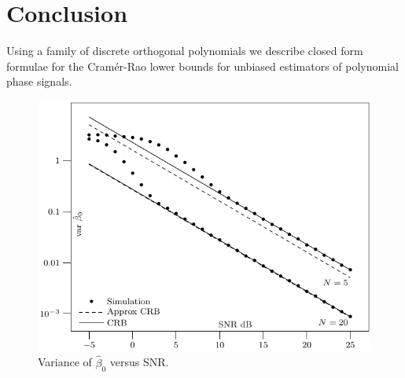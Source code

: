 \documentclass[review]{elsarticle}
\begin{document}
 
\section{Conclusion}

Using a family of discrete orthogonal polynomials we describe closed form formulae for the Cram\'{e}r-Rao lower bounds for unbiased estimators of polynomial phase signals.



\small 






 \begin{figure}[p]
    	\centering 
   		\includegraphics{code/data/plot-1-mps.pdf} 
    		\caption{Variance of $\hat{\beta}_0$ versus SNR.} 
    		\label{plot:phase0} 
 \end{figure} 

\clearpage
\end{document}
